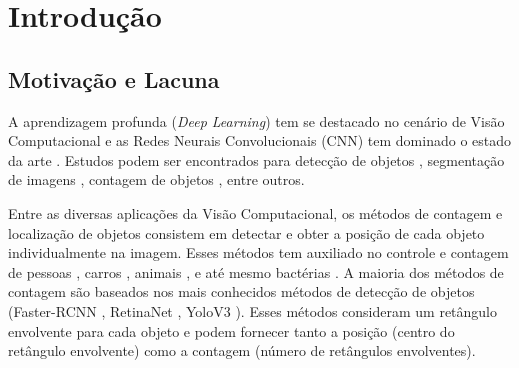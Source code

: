 
\chapter{Introdução}
 
 \section{Motivação e Lacuna}
 \label{sec:Motivacao}

    
A aprendizagem profunda (\textit{Deep Learning}) tem se destacado no cenário de Visão Computacional e as Redes Neurais Convolucionais (CNN) \cite{Simonyan14c} tem dominado o estado da arte \cite{ANN}. Estudos podem ser encontrados para detecção de objetos \cite{DBLP:journals/corr/abs-1904-00889, 8437104, 8489369, rs11010011, 8186148}, segmentação de imagens \cite{Zhao2017CVPR,DBLP:journals/corr/CaoSWS16}, contagem de objetos \cite{8186148,DBLP:journals/corr/CaoSWS16,articleLuiz}, entre outros.
    
Entre as diversas aplicações da Visão Computacional, os métodos de contagem e localização de objetos consistem em detectar e obter a posição de cada objeto individualmente na imagem.
Esses métodos tem auxiliado no controle e contagem de pessoas \cite{ExtractHuman}, carros \cite{CarCount}, animais \cite{8639306}, e até mesmo bactérias \cite{7320116}.
    A maioria dos métodos de contagem são baseados nos mais conhecidos métodos de detecção de objetos (Faster-RCNN \cite{DBLP:journals/corr/Girshick15}, RetinaNet \cite{DBLP:journals/corr/abs-1708-02002}, YoloV3 \cite{DBLP:journals/corr/abs-1804-02767}).
    Esses métodos consideram um retângulo envolvente para cada objeto e podem fornecer tanto a posição (centro do retângulo envolvente) como a contagem (número de retângulos envolventes). 
    
